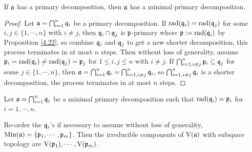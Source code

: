 \begin{proposition}\label{4.27}
    If $\mathfrak{a}$ has a primary decomposition, then $\mathfrak{a}$ has a minimal primary decomposition.
\end{proposition}

\begin{proof}
    Let $\mathfrak{a} = \bigcap_{i=1}^{n} \mathfrak{q}_i$ be a primary decomposition. If $\operatorname{rad}(\mathfrak{q}_i) = \operatorname{rad}(\mathfrak{q}_j)$ for some $i,j \in \{1,\cdots,n\}$ with $i \neq j$, then $\mathfrak{q}_i \cap \mathfrak{q}_j$ is $\mathfrak{p}$-primary where $\mathfrak{p} := \operatorname{rad}(\mathfrak{q}_i)$ by Proposition \ref{4.22}, so combine $\mathfrak{q}_i$ and $\mathfrak{q}_j$ to get a new shorter decomposition, this process terminates in at most $n$ steps. Then without loss of generality, assume $\mathfrak{p}_i = \operatorname{rad}(\mathfrak{q}_i) \neq \operatorname{rad}(\mathfrak{q}_j) = \mathfrak{p}_j$ for $1 \leq i,j \leq n$ with $i \neq j$. If $\bigcap_{i=1,i\neq j}^{n} \mathfrak{p}_i \subseteq \mathfrak{q}_j$ for some $j \in \{1,\cdots,n\}$, then $\mathfrak{a} = \bigcap_{i=1}^{n} \mathfrak{q}_i = \bigcap_{i=1,i \neq j}^{n} \mathfrak{q}_i$, so $\bigcap_{i=1,i \neq j}^{n} \mathfrak{q}_i$ is a shorter decomposition, the process terminates in at most $n$ steps.
\end{proof}

\noindent Let $\mathfrak{a} = \bigcap_{i=1}^{n} \mathfrak{q}_i$ be a minimal primary decomposition such that $\operatorname{rad}(\mathfrak{q}_i) = \mathfrak{p}_i$ for $i = 1,\cdots,n$.

\begin{proposition}\label{4.28}
    Re-order the $\mathfrak{q}_i$'s if necessary to assume without loss of generality, $\operatorname{Min}(\mathfrak{a}) = \{\mathfrak{p}_1,\cdots,\mathfrak{p}_m\}$. Then the irreducible components of $\operatorname{V}(\mathfrak{a})$ with subspace topology are $\operatorname{V}(\mathfrak{p}_1),\cdots,\operatorname{V}(\mathfrak{p}_m)$.
\end{proposition}

